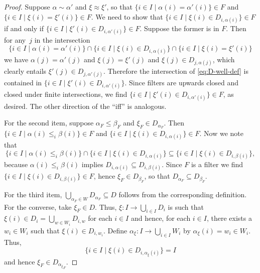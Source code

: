\documentclass[submission,copyright,creativecommons]{eptcs}
\begin{document}
    \begin{proof}
    Suppose $\alpha \sim \alpha'$ and $\xi \approx \xi'$, so that
      $\{ i \in I \mid \alpha(i) = \alpha'(i) \} \in F$ and $\{ i \in I \mid \xi(i) = \xi'(i) \} \in F$.
      We need to show that $\{ i \in I \mid \xi(i) \in D_{i,\alpha(i)} \} \in F$
      if and only if $\{ i \in I \mid \xi'(i) \in D_{i,\alpha'(i)} \} \in F$.
      Suppose the former is in $F$. Then for any~$j$ in the intersection
      \begin{equation}\label{eq:D-well-def}
        \{ i \in I \mid \alpha(i) = \alpha'(i) \}
          \cap \{ i \in I \mid \xi(i) \in D_{i,\alpha(i)} \} \cap \{ i \in I \mid \xi(i) = \xi'(i) \}
      \end{equation}
      we have $\alpha(j) = \alpha'(j)$ and $\xi(j) = \xi'(j)$
      and $\xi(j) \in D_{j, \alpha(j)}$, which clearly entails
      $\xi'(j) \in D_{j, \alpha'(j)}$. Therefore the intersection of
      \eqref{eq:D-well-def} is contained in
      $\{ i \in I \mid \xi'(i) \in D_{i, \alpha'(i)}\}$.
      Since filters are upwards closed and closed under finite intersections,
      we find $\{ i \in I \mid \xi'(i) \in D_{i,\alpha'(i)}\} \in F$,
      as desired. The other direction of the ``iff'' is analogous.

      For the second item, suppose $\alpha_F \leq \beta_F$ and $\xi_F \in D_{\alpha_F}$.
      Then $\{ i \in I \mid \alpha(i) \leq_i \beta(i) \} \in F$
      and $\{ i \in I \mid \xi(i) \in D_{i,\alpha(i)} \} \in F$.
      Now we note that
      \begin{equation*}
        \{ i \in I \mid \alpha(i) \leq_i \beta(i) \}
          \cap \{ i \in I \mid \xi(i) \in D_{i,\alpha(i)} \}
          \subseteq \{ i \in I \mid \xi(i) \in D_{i,\beta(i)} \},
      \end{equation*}
      because $\alpha(i) \leq_i \beta(i)$ implies $D_{i,\alpha(i)} \subseteq D_{i,\beta(i)}$. 
      Since $F$ is a filter we find
      $\{ i \in I \mid \xi(i) \in D_{i,\beta(i)} \} \in F$,
      hence $\xi_F \in D_{\beta_F}$, so that $D_{\alpha_F} \subseteq D_{\beta_F}$.

      For the third item, $\bigcup_{\alpha_F \in W} D_{\alpha_F} \subseteq D$ follows from the corresponding definition. For the converse, take $\xi_F \in D$. Thus, $\xi: I \to \bigcup_{i \in I} D_i$ is such that $\xi(i) \in D_i=\bigcup_{w \in W_i} D_{i,w}$ for each $i \in I$ and hence, for each $i \in I$, there exists a $w_i \in W_i$ such that $\xi(i) \in D_{i,w_i}$. Define $\alpha_\xi : I \to \bigcup_{i \in I} W_i$ by $\alpha_\xi (i) = w_i \in W_i$. Thus,
      $$\{ i \in I \mid \xi(i) \in D_{i,\alpha_\xi(i)}\} = I$$
      and hence $\xi_F \in D_{{\alpha_\xi}_F}$.
    \end{proof}
\end{document}
